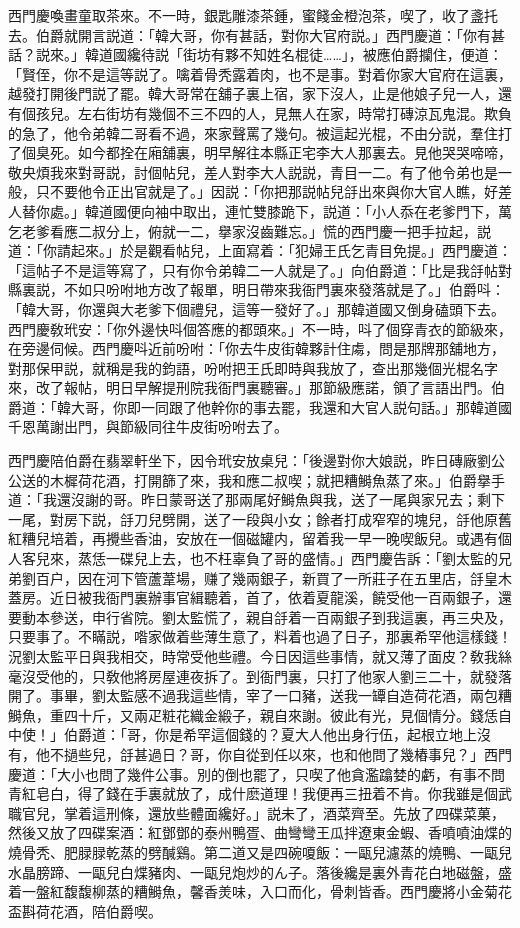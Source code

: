 西門慶喚畫童取茶來。不一時，銀匙雕漆茶鍾，蜜餞金橙泡茶，喫了，收了盞托去。伯爵就開言説道：「韓大哥，你有甚話，對你大官府説。」西門慶道：「你有甚話？説來。」韓道國纔待説「街坊有夥不知姓名棍徒……」，被應伯爵攔住，便道：「賢侄，你不是這等説了。噙着骨秃露着肉，也不是事。對着你家大官府在這裏，越發打開後門説了罷。韓大哥常在舖子裏上宿，家下沒人，止是他娘子兒一人，還有個孩兒。左右街坊有幾個不三不四的人，見無人在家，時常打磚涼瓦鬼混。欺負的急了，他令弟韓二哥看不過，來家聲罵了幾句。被這起光棍，不由分説，羣住打了個臭死。如今都拴在廂舖裏，明早解往本縣正宅李大人那裏去。見他哭哭啼啼，敬央煩我來對哥説，討個帖兒，差人對李大人説説，青目一二。有了他令弟也是一般，只不要他令正出官就是了。」因説：「你把那説帖兒㧱出來與你大官人瞧，好差人替你處。」韓道國便向袖中取出，連忙雙膝跪下，説道：「小人忝在老爹門下，萬乞老爹看應二叔分上，俯就一二，擧家沒齒難忘。」慌的西門慶一把手拉起，説道：「你請起來。」於是觀看帖兒，上面寫着：「犯婦王氏乞青目免提。」西門慶道：「這帖子不是這等寫了，只有你令弟韓二一人就是了。」向伯爵道：「比是我㧱帖對縣裏説，不如只吩咐地方改了報單，明日帶來我衙門裏來發落就是了。」伯爵呌：「韓大哥，你還與大老爹下個禮兒，這等一發好了。」那韓道國又倒身磕頭下去。西門慶敎玳安：「你外邊快呌個答應的都頭來。」不一時，呌了個穿青衣的節級來，在旁邊伺候。西門慶呌近前吩咐：「你去牛皮街韓夥計住䖏，問是那牌那舖地方，對那保甲説，就稱是我的鈞語，吩咐把王氏即時與我放了，查出那幾個光棍名字來，改了報帖，明日早解提刑院我衙門裏聽審。」那節級應諾，領了言語出門。伯爵道：「韓大哥，你即一同跟了他幹你的事去罷，我還和大官人説句話。」那韓道國千恩萬謝出門，與節級同往牛皮街吩咐去了。

西門慶陪伯爵在翡翠軒坐下，因令玳安放桌兒：「後邊對你大娘説，昨日磚廠劉公公送的木樨荷花酒，打開篩了來，我和應二叔喫；就把糟鰣魚蒸了來。」伯爵擧手道：「我還沒謝的哥。昨日蒙哥送了那兩尾好鰣魚與我，送了一尾與家兄去；剩下一尾，對房下説，㧱刀兒劈開，送了一段與小女；餘者打成窄窄的塊兒，㧱他原舊紅糟兒培着，再攪些香油，安放在一個磁罐内，留着我一早一晚喫飯兒。或遇有個人客兒來，蒸恁一碟兒上去，也不枉辜負了哥的盛情。」西門慶告訴：「劉太監的兄弟劉百户，因在河下管蘆葦場，赚了幾兩銀子，新買了一所莊子在五里店，㧱皇木蓋房。近日被我衙門裏辦事官緝聽着，首了，依着夏龍溪，饒受他一百兩銀子，還要動本參送，申行省院。劉太監慌了，親自㧱着一百兩銀子到我這裏，再三央及，只要事了。不瞞説，喒家做着些薄生意了，料着也過了日子，那裏希罕他這樣錢！況劉太監平日與我相交，時常受他些禮。今日因這些事情，就又薄了面皮？敎我絲毫沒受他的，只敎他將房屋連夜拆了。到衙門裏，只打了他家人劉三二十，就發落開了。事畢，劉太監感不過我這些情，宰了一口豬，送我一罈自造荷花酒，兩包糟鰣魚，重四十斤，又兩疋粧花織金緞子，親自來謝。彼此有光，見個情分。錢恁自中使！」伯爵道：「哥，你是希罕這個錢的？夏大人他出身行伍，起根立地上沒有，他不撾些兒，㧱甚過日？哥，你自從到任以來，也和他問了幾樁事兒？」西門慶道：「大小也問了幾件公事。別的倒也罷了，只喫了他貪濫蹹婪的虧，有事不問青紅皂白，得了錢在手裏就放了，成什麽道理！我便再三扭着不肯。你我雖是個武職官兒，掌着這刑條，還放些體面纔好。」説未了，酒菜齊至。先放了四碟菜菓，然後又放了四碟案酒：紅鄧鄧的泰州鴨疍、曲彎彎王瓜拌遼東金蝦、香噴噴油煠的燒骨秃、肥䐂䐂乾蒸的劈醎鷄。第二道又是四碗嗄飯：一甌兒濾蒸的燒鴨、一甌兒水晶膀蹄、一甌兒白煠豬肉、一甌兒炮炒的ん子。落後纔是裏外青花白地磁盤，盛着一盤紅馥馥柳蒸的糟鰣魚，馨香羙味，入口而化，骨刺皆香。西門慶將小金菊花盃斟荷花酒，陪伯爵喫。

